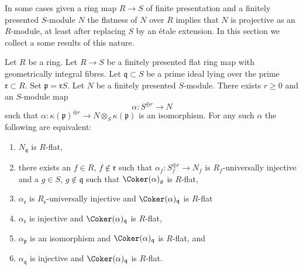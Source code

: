 \noindent
In some cases given a ring map $R \to S$ of finite presentation and
a finitely presented $S$-module $N$ the flatness of $N$ over $R$ implies
that $N$ is projective as an $R$-module, at least after replacing $S$
by an \'etale extension. In this section we collect a some results
of this nature.

\begin{lemma}
\label{lemma-induction-step-fp}
Let $R$ be a ring. Let $R \to S$ be a finitely presented
flat ring map with geometrically integral fibres. Let
$\mathfrak q \subset S$ be a prime ideal lying over the prime
$\mathfrak r \subset R$. Set $\mathfrak p = \mathfrak r S$.
Let $N$ be a finitely presented $S$-module.
There exists $r \geq 0$ and an $S$-module map
$$
\alpha : S^{\oplus r} \longrightarrow N
$$
such that
$\alpha : \kappa(\mathfrak p)^{\oplus r} \to N \otimes_S \kappa(\mathfrak p)$
is an isomorphism. For any such $\alpha$ the following are equivalent:
\begin{enumerate}
\item $N_{\mathfrak q}$ is $R$-flat,
\item there exists an $f \in R$, $f \not \in \mathfrak r$ such that
$\alpha_f : S_f^{\oplus r} \to N_f$ is $R_f$-universally injective and
a $g \in S$, $g \not \in \mathfrak q$ such that $\Coker(\alpha)_g$
is $R$-flat,
\item $\alpha_{\mathfrak r}$ is $R_{\mathfrak r}$-universally injective and
$\Coker(\alpha)_{\mathfrak q}$ is $R$-flat
\item $\alpha_{\mathfrak r}$ is injective and
$\Coker(\alpha)_{\mathfrak q}$ is $R$-flat,
\item $\alpha_{\mathfrak p}$ is an isomorphism and
$\Coker(\alpha)_{\mathfrak q}$ is $R$-flat, and
\item $\alpha_{\mathfrak q}$ is injective and
$\Coker(\alpha)_{\mathfrak q}$ is $R$-flat.
\end{enumerate}
\end{lemma}


